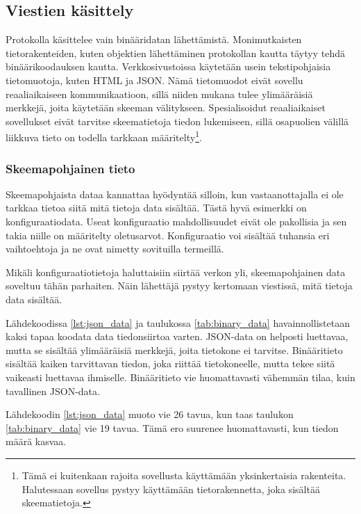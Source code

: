 \documentclass[a4paper,12pt]{article}
\begin{document}
    \subsection{Viestien käsittely}
    Protokolla käsittelee vain binääridatan lähettämistä. Monimutkaisten tietorakenteiden, kuten objektien lähettäminen protokollan kautta täytyy tehdä binäärikoodauksen kautta. Verkkosivustoissa käytetään usein tekstipohjaisia tietomuotoja, kuten HTML ja JSON. Nämä tietomuodot eivät sovellu reaaliaikaiseen kommunikaatioon, sillä niiden mukana tulee ylimääräisiä merkkejä, joita käytetään skeeman välitykseen. Spesialisoidut reaaliaikaiset sovellukset eivät tarvitse skeematietoja tiedon lukemiseen, sillä osapuolien välillä liikkuva tieto on todella tarkkaan määritelty\footnote{Tämä ei kuitenkaan rajoita sovellusta käyttämään yksinkertaisia rakenteita. Halutessaan sovellus pystyy käyttämään tietorakennetta, joka sisältää skeematietoja.}. \par

    \subsubsection{Skeemapohjainen tieto}
    Skeemapohjaista dataa kannattaa hyödyntää silloin, kun vastaanottajalla ei ole tarkkaa tietoa siitä mitä tietoja data sisältää. Tästä hyvä esimerkki on konfiguraatiodata.
    Useat konfiguraatio mahdollisuudet eivät ole pakollisia ja sen takia niille on määritelty oletusarvot. Konfiguraatio voi sisältää tuhansia eri vaihtoehtoja ja ne ovat nimetty sovituilla termeillä. \par
    Mikäli konfiguraatiotietoja haluttaisiin siirtää verkon yli, skeemapohjainen data soveltuu tähän parhaiten. Näin lähettäjä pystyy kertomaan viestissä, mitä tietoja data sisältää.


    Lähdekoodissa \ref{lst:json_data} ja taulukossa \ref{tab:binary_data} havainnollistetaan kaksi tapaa koodata data tiedonsiirtoa varten. JSON-data on helposti luettavaa, mutta se sisältää ylimääräisiä merkkejä, joita tietokone ei tarvitse. Binääritieto sisältää kaiken tarvittavan tiedon, joka riittää tietokoneelle, mutta tekee siitä vaikeasti luettavaa ihmiselle. Binääritieto vie huomattavasti vähemmän tilaa, kuin tavallinen JSON-data.\par
    Lähdekoodin \ref{lst:json_data} muoto vie 26 tavua, kun taas taulukon \ref{tab:binary_data} vie 19 tavua. Tämä ero suurenee huomattavasti, kun tiedon määrä kasvaa. \par
\end{document}
